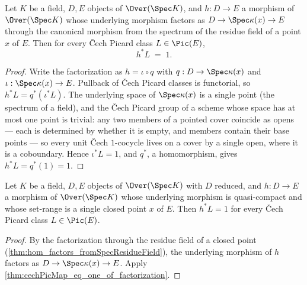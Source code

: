 \begin{theorem}
  \label{thm:cechPicMap_eq_one_of_factorization}
  \leanok
  Let \(K\) be a field, \(D, E\) objects of \(\Over(\Spec K)\), and \(h : D \to E\) a
  morphism of \(\Over(\Spec K)\) whose underlying morphism factors as
  \(D \to \Spec \kappa(x) \to E\) through the canonical morphism from the spectrum of
  the residue field of a point \(x\) of \(E\). Then for every \v Cech Picard class
  \(L \in \Pic(E)\),
  \[
    h^{*}L \;=\; 1 .
  \]
\end{theorem}
\begin{proof}
  \leanok
  Write the factorization as \(h = \iota \circ q\) with
  \(q : D \to \Spec \kappa(x)\) and \(\iota : \Spec \kappa(x) \to E\). Pullback of
  \v Cech Picard classes is functorial, so \(h^{*}L = q^{*}(\iota^{*}L)\). The
  underlying space of \(\Spec \kappa(x)\) is a single point (the spectrum of a field),
  and the \v Cech Picard group of a scheme whose space has at most one point is
  trivial: any two members of a pointed cover coincide as opens --- each is determined
  by whether it is empty, and members contain their base points --- so every unit
  \v Cech \(1\)-cocycle lives on a cover by a single open, where it is a coboundary.
  Hence \(\iota^{*}L = 1\), and \(q^{*}\), a homomorphism, gives
  \(h^{*}L = q^{*}(1) = 1\).
\end{proof}

\begin{corollary}
  \label{cor:cechPicMap_eq_one_of_range_eq_singleton}
  \leanok
  Let \(K\) be a field, \(D, E\) objects of \(\Over(\Spec K)\) with \(D\) reduced, and
  \(h : D \to E\) a morphism of \(\Over(\Spec K)\) whose underlying morphism is
  quasi-compact and whose set-range is a single closed point \(x\) of \(E\). Then
  \(h^{*}L = 1\) for every \v Cech Picard class \(L \in \Pic(E)\).
\end{corollary}
\begin{proof}
  \leanok
  By the factorization through the residue field of a closed point
  (\ref{thm:hom_factors_fromSpecResidueField}), the underlying morphism of \(h\)
  factors as \(D \to \Spec \kappa(x) \to E\). Apply
  \ref{thm:cechPicMap_eq_one_of_factorization}.
\end{proof}

